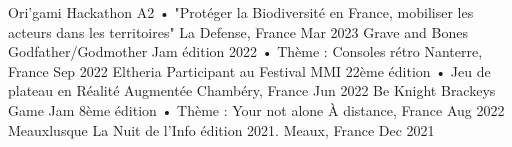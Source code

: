 


\begin{cvhonors}

\cvhonor
    {Ori'gami} %
    {Hackathon A2 • "Protéger la Biodiversité en France, mobiliser les acteurs dans les territoires"} %
    {La Defense, France} %
    {Mar 2023} %
\cvhonor
    {Grave and Bones} %
    {Godfather/Godmother Jam édition 2022 • Thème : Consoles rétro} %
    {Nanterre, France} %
    {Sep 2022} %
  \cvhonor
    {Eltheria} %
    {Participant au Festival MMI 22ème édition • Jeu de plateau en Réalité Augmentée} %
    {Chambéry, France} %
    {Jun 2022} %
    \cvhonor
    {Be Knight} %
    {Brackeys Game Jam 8ème édition • Thème : Your not alone} %
    {À distance, France} %
    {Aug 2022} %
  \cvhonor
    {Meauxlusque} %
    {La Nuit de l'Info édition 2021.} %
    {Meaux, France} %
    {Dec 2021} %
\end{cvhonors}